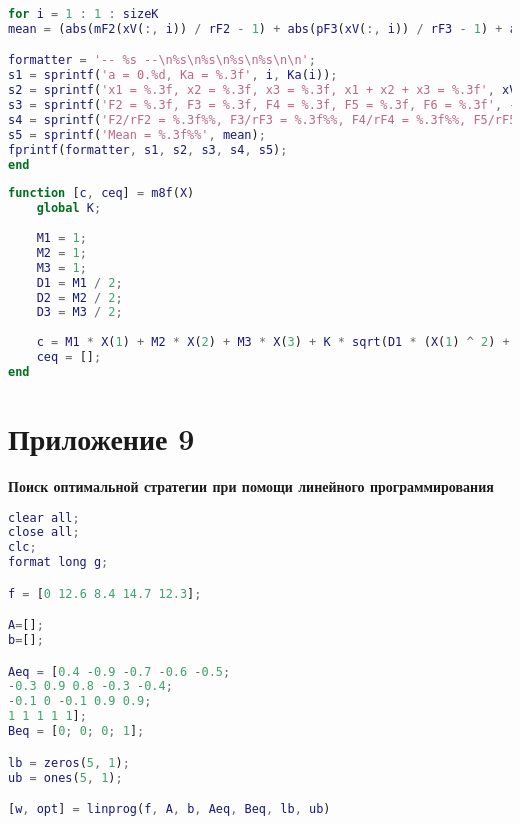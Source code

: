 \begin{lstlisting}[language={matlab}, caption={Решение задачи стохастического программирования}, label={lst:0}, basicstyle={\footnotesize\ttfamily}, breaklines={true}]
for i = 1 : 1 : sizeK
mean = (abs(mF2(xV(:, i)) / rF2 - 1) + abs(pF3(xV(:, i)) / rF3 - 1) + abs(pF4(xV(:, i)) / rF4 - 1) + abs(mF5(xV(:, i)) / rF5 - 1) + abs(mF6(xV(:, i)) / rF6 - 1)) / 5 * 100;

formatter = '-- %s --\n%s\n%s\n%s\n%s\n\n';
s1 = sprintf('a = 0.%d, Ka = %.3f', i, Ka(i));
s2 = sprintf('x1 = %.3f, x2 = %.3f, x3 = %.3f, x1 + x2 + x3 = %.3f', xV(:, i), sum(xV(:, i)));
s3 = sprintf('F2 = %.3f, F3 = %.3f, F4 = %.3f, F5 = %.3f, F6 = %.3f', -mF2(xV(:, i)), pF3(xV(:, i)), pF4(xV(:, i)), -mF5(xV(:, i)), -mF6(xV(:, i)));
s4 = sprintf('F2/rF2 = %.3f%%, F3/rF3 = %.3f%%, F4/rF4 = %.3f%%, F5/rF5 = %.3f%%, F6/rF6 = %.3f%%', mF2(xV(:, i)) / rF2 * 100, pF3(xV(:, i)) / rF3 * 100, pF4(xV(:, i)) / rF4 * 100, mF5(xV(:, i)) / rF5 * 100, mF6(xV(:, i)) / rF6 * 100);
s5 = sprintf('Mean = %.3f%%', mean);
fprintf(formatter, s1, s2, s3, s4, s5);
end

\end{lstlisting}

\begin{lstlisting}[language={matlab}, caption={Внутренняя функция для решения задачи стохастического программирования}, label={lst:0}, basicstyle={\footnotesize\ttfamily}, breaklines={true}]
function [c, ceq] = m8f(X)
	global K;
	
	M1 = 1;
	M2 = 1;
	M3 = 1;
	D1 = M1 / 2;
	D2 = M2 / 2;
	D3 = M3 / 2;
	
	c = M1 * X(1) + M2 * X(2) + M3 * X(3) + K * sqrt(D1 * (X(1) ^ 2) + D2 * (X(2) ^ 2) + D3 * (X(3) ^ 2)) - 80;
	ceq = [];
end
\end{lstlisting}

\section*{Приложение 9} \label{p2:9}
\textbf{Поиск оптимальной стратегии при помощи линейного программирования}
\begin{lstlisting}[language={matlab}, caption={Поиск оптимальной стратегии при помощи линейного программирования}, label={lst:0}, basicstyle={\footnotesize\ttfamily}, breaklines={true}]
clear all;
close all; 
clc;
format long g;

f = [0 12.6 8.4 14.7 12.3];

A=[];
b=[];

Aeq = [0.4 -0.9 -0.7 -0.6 -0.5;
-0.3 0.9 0.8 -0.3 -0.4;
-0.1 0 -0.1 0.9 0.9;
1 1 1 1 1];
Beq = [0; 0; 0; 1];

lb = zeros(5, 1);
ub = ones(5, 1);

[w, opt] = linprog(f, A, b, Aeq, Beq, lb, ub)
\end{lstlisting}


